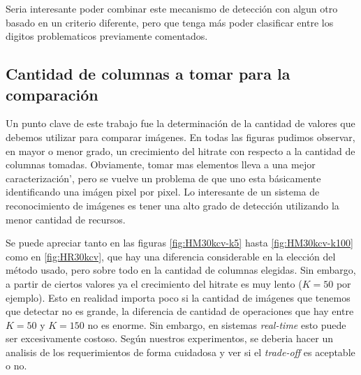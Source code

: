 Seria interesante poder combinar este mecanismo de detecci\'on con algun otro basado en un
criterio diferente, pero que tenga m\'as poder clasificar entre los digitos problematicos
previamente comentados.


\subsection{Cantidad de columnas a tomar para la comparaci\'on}
Un punto clave de este trabajo fue la determinaci\'on de la cantidad de valores que debemos
utilizar para comparar im\'agenes. En todas las figuras pudimos observar, en mayor o menor
grado, un crecimiento del hitrate con respecto a la cantidad de columnas tomadas.
Obviamente, tomar mas elementos lleva a una mejor caracterizaci\'on', pero se vuelve un problema
de que uno esta b\'asicamente identificando una im\'agen pixel por pixel. Lo interesante de un
sistema de reconocimiento de im\'agenes es tener una alto grado de detecci\'on utilizando la menor
cantidad de recursos.


Se puede apreciar tanto en las figuras \ref{fig:HM30kcv-k5} hasta \ref{fig:HM30kcv-k100} como
en \ref{fig:HR30kcv}, que hay una diferencia considerable en la elecci\'on del m\'etodo usado,
pero sobre todo en la cantidad de columnas elegidas. Sin embargo, a partir de ciertos valores
ya el crecimiento del hitrate es muy lento ($K=50$ por ejemplo). Esto en realidad importa poco
si la cantidad de im\'agenes que tenemos que detectar no es grande, la diferencia de cantidad
de operaciones que hay entre $K=50$ y $K=150$ no es enorme. Sin embargo, en sistemas \textit{real-time}
esto puede ser excesivamente costoso. Seg\'un nuestros experimentos, se deberia hacer un analisis
de los requerimientos de forma cuidadosa y ver si el \textit{trade-off} es aceptable o no.